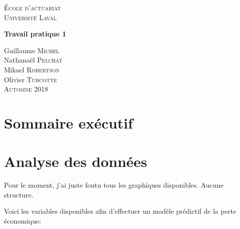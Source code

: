 \documentclass{article}\usepackage[]{graphicx}\usepackage[]{color}
\begin{document}
\thispagestyle{empty}
\begin{center}

\vspace{3cm}

\textsc{\Large École d'actuariat}\\
\textsc{\Large Université Laval}\\[0.5cm]

\vspace{5cm}

{ \LARGE \bfseries Travail pratique 1  \\ }

\vfill

\Large Guillaume \textsc{Michel}\\
\Large Nathanaël \textsc{Pelchat}\\
\Large Mikael \textsc{Robertson}\\
\Large Olivier \textsc{Turcotte}\\
\vspace{3cm}
{\Large \textsc{Automne} 2018}

\end{center}
\newpage




\section{Sommaire exécutif}
\label{sec:sommaire}


\newpage
\tableofcontents
\newpage

\section{Analyse des données} 
\label{sec:analyse}
Pour le moment, j'ai juste foutu tous les graphiques disponibles. Aucune structure.

Voici les variables disponibles afin d'effectuer un modèle prédictif de la perte économique:
\end{document}

